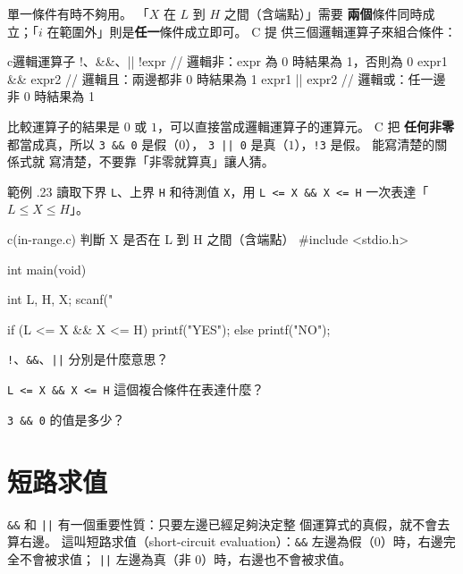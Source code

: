 單一條件有時不夠用。 「$X$ 在 $L$ 到 $H$ 之間（含端點）」需要\textbf{
兩個}條件同時成立；「$i$ 在範圍外」則是\textbf{任一}條件成立即可。 C 提
供三個邏輯運算子來組合條件：

\begin{code}{c}{邏輯運算子 !、\&\&、||}
!expr          // 邏輯非：expr 為 0 時結果為 1，否則為 0
expr1 && expr2 // 邏輯且：兩邊都非 0 時結果為 1
expr1 || expr2 // 邏輯或：任一邊非 0 時結果為 1
\end{code}

比較運算子的結果是 $0$ 或 $1$，可以直接當成邏輯運算子的運算元。 C 把
\textbf{任何非零}都當成真，所以 \texttt{3 \&\& 0} 是假（$0$），
\texttt{3 || 0} 是真（$1$），\texttt{!3} 是假。 能寫清楚的關係式就
寫清楚，不要靠「非零就算真」讓人猜。

範例 \thechapter.23 讀取下界 \texttt{L}、上界 \texttt{H} 和待測值
\texttt{X}，用 \texttt{L <= X \&\& X <= H} 一次表達「$L \le X \le H$」。

\begin{example}{c}{(in-range.c) 判斷 X 是否在 L 到 H 之間（含端點）}
#include <stdio.h>

int main(void) {
    int L, H, X;
    scanf("%

    if (L <= X && X <= H) {
        printf("YES\n");
    } else {
        printf("NO\n");
    }
}
\end{example}


\begin{drills}[label=drills:cond-logical-ops]
\item \texttt{!}、\texttt{\&\&}、\texttt{||} 分別是什麼意思？
\item \texttt{L <= X \&\& X <= H} 這個複合條件在表達什麼？
\item \texttt{3 \&\& 0} 的值是多少？
\end{drills}

\section{短路求值}
\label{sec:cond-short-circuit}

\texttt{\&\&} 和 \texttt{||} 有一個重要性質：只要左邊已經足夠決定整
個運算式的真假，就不會去算右邊。 這叫短路求值（short-circuit
evaluation）：\texttt{\&\&} 左邊為假（$0$）時，右邊完全不會被求值；
\texttt{||} 左邊為真（非 $0$）時，右邊也不會被求值。

